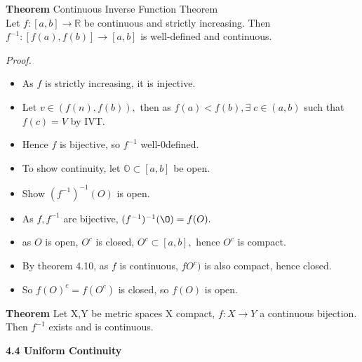 \documentclass[12pt]{article}
\begin{document}
\begin{block}{\bf Theorem} Continuous Inverse Function Theorem\\
Let $f:[a,b]\rightarrow\mathbb{R}$ be continuous and strictly increasing. Then $f^{-1}:[f(a),f(b)]\rightarrow [a,b]$ is well-defined and continuous.\end{block}

\vspace{1.5\baselinestretch}
{\sl Proof.}
\begin{itemize}
    \item As $f$ is strictly increasing, it is injective.
    \item Let $v\in (f(n), f(b)),$ then as $f(a)<f(b), \exists\;c\in(a,b)$ such that $f(c)=V$ by IVT.
    \item Hence $f$ is bijective, so $f^{-1}$ well-0defined.
    \item To show continuity, let $\mathbb{O}\subset[a,b]$ be open.
    \item Show $(f^{-1})^{-1}(O)$ is open.
    \item As $f, f^{-1}$ are bijective, $(f^{-1})^{-1}(\O) = f(O).$
    \item as $O$ is open, $O^c$ is closed, $O^c \subset[a,b],$ hence $O^c$ is compact.
    \item By theorem 4.10, as $f$ is continuous, $fO^c)$ is also compact, hence closed.
    \item So $f(O)^c = f(O^c)$ is closed, so $f(O)$ is open.
\end{itemize}

\vspace{1.5\baselineskip}
\begin{block}{\bf Theorem}
Let X,Y be metric spaces X compact, $f: X\rightarrow Y$ a continuous bijection. Then $f^{-1}$ exists and is continuous.
\end{block}

\vspace{1.5\baselineskip}
{\bf 4.4 Uniform Continuity}\\
\end{document}
